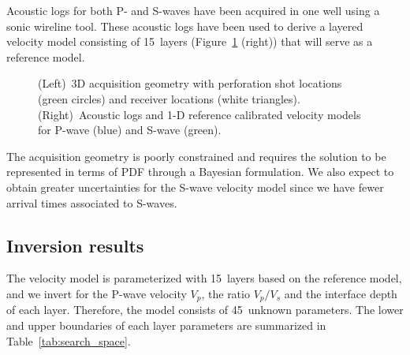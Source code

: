Acoustic logs for both P- and S-waves have been acquired in one well using a sonic wireline tool. These acoustic logs have been used to derive a layered velocity model consisting of 15~layers (Figure~\ref{fig:real_data} (right)) that will serve as a reference model.

\begin{figure}[!htbp]
	\centering
	\captionsetup[subfigure]{position = top}
	\caption{(Left)~3D acquisition geometry with perforation shot locations (green circles) and receiver locations (white triangles). (Right)~Acoustic logs and 1-D reference calibrated velocity models for P-wave (blue) and S-wave (green).}
	\label{fig:real_data}
\end{figure}

The acquisition geometry is poorly constrained and requires the solution to be represented in terms of PDF through a Bayesian formulation. We also expect to obtain greater uncertainties for the S-wave velocity model since we have fewer arrival times associated to S-waves. 


\subsection{Inversion results}
\label{ssec:inversion_results}

The velocity model is parameterized with 15~layers based on the reference model, and we invert for the P-wave velocity $V_{p}$, the ratio $V_{p}/V_{s}$ and the interface depth of each layer. Therefore, the model consists of 45~unknown parameters. The lower and upper boundaries of each layer parameters are summarized in Table~\ref{tab:search_space}.

